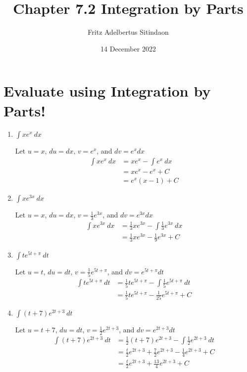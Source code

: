 \documentclass[12pt]{article}
\title{Chapter 7.2 Integration by Parts}
\author{Fritz Adelbertus Sitindaon}
\date{14 December 2022}
\begin{document}
\maketitle

\section{Evaluate using Integration by Parts!}  
  
\begin{enumerate}
\item $\displaystyle\int xe^x \ dx $

Let $u = x$, $du=dx$, $v=e^x$, and $dv =e^xdx$
\begin{equation*}
\begin{aligned}
\int xe^x \ dx &= xe^x - \int e^x \ dx \\
&= xe^x - e^x + C \\
&= e^x(x-1) + C
\end{aligned}
\end{equation*}

\item $\displaystyle\int xe^{3x} \ dx $

Let $u = x$, $du=dx$, $v=\displaystyle\frac{1}{3}e^{3x}$, and $dv =e^{3x}dx$
\begin{equation*}
\begin{aligned}
\int xe^{3x} \ dx &= \frac{1}{3}xe^{3x} - \int \frac{1}{3} e^{3x} \ dx \\
&= \frac{1}{3}xe^{3x} - \frac{1}{9}e^{3x} + C
\end{aligned}
\end{equation*}
  
\item $\displaystyle\int te^{5t+\pi} \ dt$

Let $u = t$, $du=dt$, $v=\displaystyle\frac{1}{5}e^{5t+\pi}$, and $dv =e^{5t+\pi}dt$
\begin{equation*}
\begin{aligned}
\int te^{5t+\pi} \ dt &= \frac{1}{5}te^{5t+\pi} - \int \frac{1}{5} e^{5t+\pi} \ dt \\
&= \frac{1}{5}te^{5t+\pi} - \frac{1}{25} e^{5t+\pi} + C
\end{aligned}
\end{equation*}

\item $\displaystyle\int (t+7)e^{2t+3} \ dt$

Let $u = t+7$, $du=dt$, $\displaystyle v=\frac{1}{2}e^{2t+3}$, and $dv =e^{2t+3}dt$
\begin{equation*}
\begin{aligned}
\int (t+7)e^{2t+3} \ dt &= \frac{1}{2}(t+7)e^{2t+3} - \int \frac{1}{2} e^{2t+3} \ dt \\
&= \frac{t}{2}e^{2t+3} + \frac{7}{2}e^{2t+3} - \frac{1}{4} e^{2t+3} + C \\
&= \frac{t}{2}e^{2t+3} + \frac{13}{4}e^{2t+3} + C \\
\end{aligned}
\end{equation*}


\end{enumerate}
\end{document}
